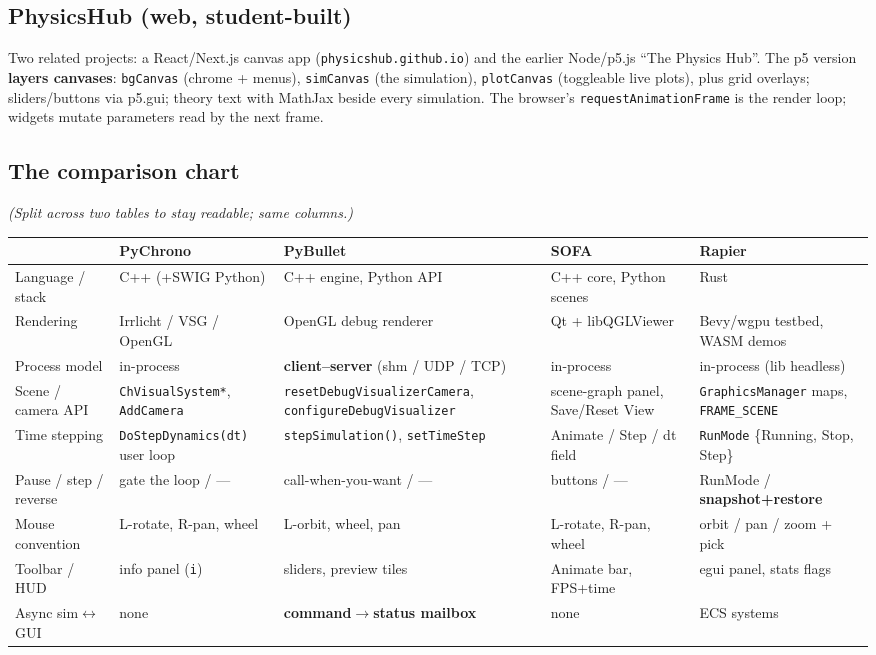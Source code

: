 \documentclass[11pt]{article}
\newcommand{\code}[1]{\texttt{#1}}
\begin{document}
\subsection{PhysicsHub (web, student-built)}

Two related projects: a React/Next.js canvas app
(\code{physicshub.github.io}) and the earlier Node/p5.js ``The
Physics Hub''. The p5 version \textbf{layers canvases}:
\code{bgCanvas} (chrome + menus), \code{simCanvas} (the simulation),
\code{plotCanvas} (toggleable live plots), plus grid overlays;
sliders/buttons via p5.gui; theory text with MathJax beside every
simulation. The browser's \code{requestAnimationFrame} is the render
loop; widgets mutate parameters read by the next frame.

\subsection{The comparison chart}

\emph{(Split across two tables to stay readable; same columns.)}

\begin{center}\small
\begin{tabular}{lp{3.1cm}p{3.3cm}p{2.9cm}p{3.2cm}}
 & \textbf{PyChrono} & \textbf{PyBullet} & \textbf{SOFA} & \textbf{Rapier}\\\hline
Language / stack & C++ (+SWIG Python) & C++ engine, Python API & C++ core, Python scenes & Rust\\
Rendering & Irrlicht / VSG / OpenGL & OpenGL debug renderer & Qt + libQGLViewer & Bevy/wgpu testbed, WASM demos\\
Process model & in-process & \textbf{client--server} (shm / UDP / TCP) & in-process & in-process (lib headless)\\
Scene / camera API & \code{ChVisualSystem*}, \code{AddCamera} & \code{resetDebugVisualizerCamera}, \code{configureDebugVisualizer} & scene-graph panel, Save/Reset View & \code{GraphicsManager} maps, \code{FRAME\_SCENE}\\
Time stepping & \code{DoStepDynamics(dt)} user loop & \code{stepSimulation()}, \code{setTimeStep} & Animate / Step / dt field & \code{RunMode} \{Running, Stop, Step\}\\
Pause / step / reverse & gate the loop / --- & call-when-you-want / --- & buttons / --- & RunMode / \textbf{snapshot+restore}\\
Mouse convention & L-rotate, R-pan, wheel & L-orbit, wheel, pan & L-rotate, R-pan, wheel & orbit / pan / zoom + pick\\
Toolbar / HUD & info panel (\code{i}) & sliders, preview tiles & Animate bar, FPS+time & egui panel, stats flags\\
Async sim$\leftrightarrow$GUI & none & \textbf{command$\to$status mailbox} & none & ECS systems\\
\end{tabular}
\end{center}
\end{document}
